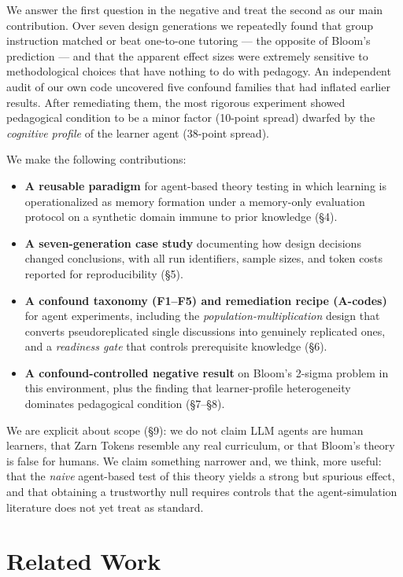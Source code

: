 \documentclass[11pt]{article}
\begin{document}
We answer the first question in the negative and treat the second as our main
contribution.  Over seven design generations we repeatedly found that group
instruction matched or beat one-to-one tutoring --- the opposite of Bloom's
prediction --- and that the apparent effect sizes were extremely sensitive to
methodological choices that have nothing to do with pedagogy.  An independent audit
of our own code uncovered five confound families that had inflated earlier results.
After remediating them, the most rigorous experiment showed pedagogical condition to
be a minor factor (10-point spread) dwarfed by the \emph{cognitive profile} of the
learner agent (38-point spread).

We make the following contributions:
\begin{itemize}
  \item \textbf{A reusable paradigm} for agent-based theory testing in which learning
    is operationalized as memory formation under a memory-only evaluation protocol on
    a synthetic domain immune to prior knowledge (\S4).
  \item \textbf{A seven-generation case study} documenting how design decisions
    changed conclusions, with all run identifiers, sample sizes, and token costs
    reported for reproducibility (\S5).
  \item \textbf{A confound taxonomy (F1--F5) and remediation recipe (A-codes)} for
    agent experiments, including the \emph{population-multiplication} design that
    converts pseudoreplicated single discussions into genuinely replicated ones, and a
    \emph{readiness gate} that controls prerequisite knowledge (\S6).
  \item \textbf{A confound-controlled negative result} on Bloom's 2-sigma problem in
    this environment, plus the finding that learner-profile heterogeneity dominates
    pedagogical condition (\S7--\S8).
\end{itemize}

We are explicit about scope (\S9): we do not claim LLM agents are human learners,
that Zarn Tokens resemble any real curriculum, or that Bloom's theory is false for
humans.  We claim something narrower and, we think, more useful: that the \emph{naive}
agent-based test of this theory yields a strong but spurious effect, and that
obtaining a trustworthy null requires controls that the agent-simulation literature
does not yet treat as standard.

\section{Related Work}
\end{document}
